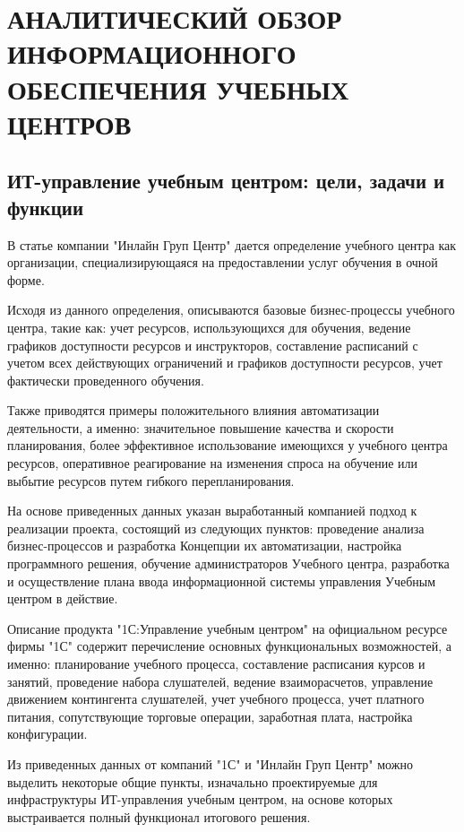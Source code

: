 \section{АНАЛИТИЧЕСКИЙ ОБЗОР ИНФОРМАЦИОННОГО ОБЕСПЕЧЕНИЯ УЧЕБНЫХ ЦЕНТРОВ}


\subsection{ИТ-управление учебным центром: цели, задачи и функции}

В статье компании "Инлайн Груп Центр" \cite{inlinegroup-c} дается определение учебного центра как организации, специализирующаяся на предоставлении услуг обучения в очной форме.

Исходя из данного определения, описываются базовые бизнес-процессы учебного центра, такие как: учет ресурсов, использующихся для обучения, ведение графиков доступности ресурсов и инструкторов, составление расписаний с учетом всех действующих ограничений и графиков доступности ресурсов, учет фактически проведенного обучения.

Также приводятся примеры положительного влияния автоматизации деятельности, а именно: значительное повышение качества и скорости планирования, более эффективное использование имеющихся у учебного центра ресурсов, оперативное реагирование на изменения спроса на обучение или выбытие ресурсов путем гибкого перепланирования.

На основе приведенных данных указан выработанный компанией подход к реализации проекта, состоящий из следующих пунктов: проведение анализа бизнес-процессов и разработка Концепции их автоматизации, настройка программного решения, обучение администраторов Учебного центра, разработка и осуществление плана ввода информационной системы управления Учебным центром в действие.

Описание продукта "1С:Управление учебным центром" на официальном ресурсе фирмы "1С" \cite{1c-training-center} содержит перечисление основных функциональных возможностей, а именно: планирование учебного процесса, составление расписания курсов и занятий, проведение набора слушателей, ведение взаиморасчетов, управление движением контингента слушателей, учет учебного процесса, учет платного питания, сопутствующие торговые операции, заработная плата, настройка конфигурации.

Из приведенных данных от компаний "1С" и "Инлайн Груп Центр" можно выделить некоторые общие пункты, изначально проектируемые для инфраструктуры ИТ-управления учебным центром, на основе которых выстраивается полный функционал итогового решения.


